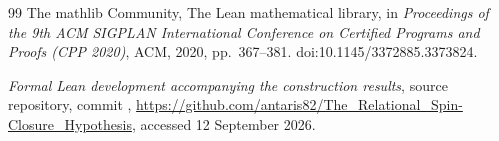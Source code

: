 \documentclass[11pt,a4paper]{article}
\theoremstyle{definition}
\theoremstyle{remark}
\begin{document}
\begin{thebibliography}{99}
The mathlib Community,
The Lean mathematical library,
in \emph{Proceedings of the 9th ACM SIGPLAN International Conference
on Certified Programs and Proofs (CPP 2020)},
ACM, 2020, pp.~367--381.
doi:10.1145/3372885.3373824.

{\raggedright
\emph{Formal Lean development accompanying the construction results},
source repository, commit
,
\url{https://github.com/antaris82/The_Relational_Spin-Closure_Hypothesis},
accessed 12 September 2026.\par}

\end{thebibliography}
\end{document}
